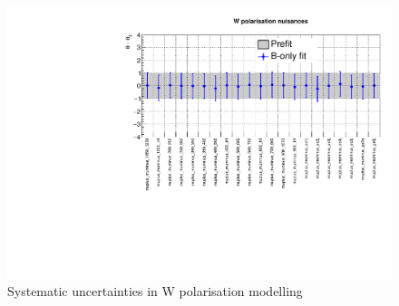 \begin{figure}[h!]
  \centering
  \caption{Systematic uncertainties in W polarisation modelling}
  \includegraphics[width=0.8\linewidth]{figures/results/36invfb/postfit/nuis/WPol_nuisances}
\end{figure}

